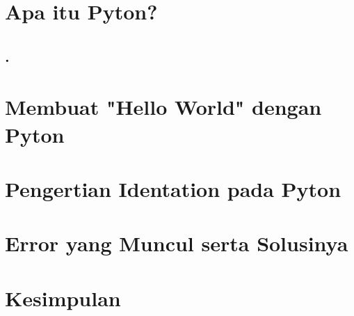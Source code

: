 \documentclass[12pt]{article}
\begin{document}
\section{Apa itu Pyton?}

\subsection{.}

\section{Membuat "Hello World" dengan Pyton}


\section{Pengertian Identation pada Pyton}


\section{Error yang Muncul serta Solusinya}


\section{Kesimpulan}
\end{document}
